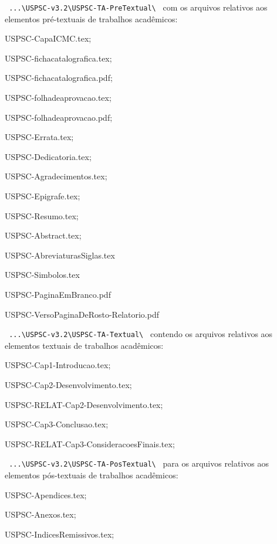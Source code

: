 \begin{alineas}
	\item \verb+ ...\USPSC-v3.2\USPSC-TA-PreTextual\ + com os arquivos relativos aos elementos pré-textuais de trabalhos acadêmicos:
		\begin{alineas}
				\item USPSC-CapaICMC.tex;
				\item USPSC-fichacatalografica.tex;
				\item USPSC-fichacatalografica.pdf;
				\item USPSC-folhadeaprovacao.tex;
				\item USPSC-folhadeaprovacao.pdf;
				\item USPSC-Errata.tex;
				\item USPSC-Dedicatoria.tex;
				\item USPSC-Agradecimentos.tex;
				\item USPSC-Epigrafe.tex;
				\item USPSC-Resumo.tex;
				\item USPSC-Abstract.tex;
				\item USPSC-AbreviaturasSiglas.tex
				\item USPSC-Simbolos.tex 
				\item USPSC-PaginaEmBranco.pdf
				\item USPSC-VersoPaginaDeRosto-Relatorio.pdf
			\end{alineas}
			
	\item \verb+ ...\USPSC-v3.2\USPSC-TA-Textual\ + contendo os arquivos relativos aos elementos textuais de trabalhos acadêmicos:
		\begin{alineas}
			\item USPSC-Cap1-Introducao.tex;
			\item USPSC-Cap2-Desenvolvimento.tex;
			\item USPSC-RELAT-Cap2-Desenvolvimento.tex;
			\item USPSC-Cap3-Conclusao.tex;
			\item USPSC-RELAT-Cap3-ConsideracoesFinais.tex;
		\end{alineas}
		
	\item \verb+ ...\USPSC-v3.2\USPSC-TA-PosTextual\ + para os arquivos relativos aos elementos pós-textuais de trabalhos acadêmicos:	
		\begin{alineas}
			\item USPSC-Apendices.tex;
			\item USPSC-Anexos.tex;
			\item USPSC-IndicesRemissivos.tex;
		\end{alineas}
	

\end{alineas}
